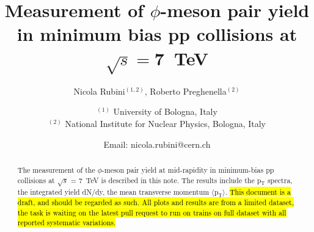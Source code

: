 \documentclass[ALICE,manyauthors]{ALICE_analysis_notes}
\begin{document}
%
%
%
\begin{titlepage}
%
\PHdate{\today}
%
\title{Measurement of $\phi$-meson pair yield in minimum bias pp collisions at $\sqrt{s}=$\SI{7}{\tera\electronvolt}}
%
\author{Nicola Rubini$^{(1,2)}$, Roberto Preghenella$^{(2)}$}
\author{
$^{(1)}$ University of Bologna, Italy\\
$^{(2)}$ National Institute for Nuclear Physics, Bologna, Italy\\
}
\author{Email: nicola.rubini@cern.ch}
%
%
\begin{abstract}
The measurement of the $\phi$-meson pair yield at mid-rapidity in minimum-bias pp collisions at $\sqrt{s}$ = \SI{7}{\tera\electronvolt} is described in this note. The results include the p$_{\text{T}}$ spectra, the integrated yield dN/dy, the mean transverse momentum $\langle \text{p}_{\text{T}} \rangle$. \hl{This document is a draft, and should be regarded as such. All plots and results are from a limited dataset, the task is waiting on the latest pull request to run on trains on full dataset with all reported systematic variations.}
\end{abstract}
\end{titlepage}
%
\tableofcontents
\newpage
%
%
\setcounter{secnumdepth}{0}

\setcounter{secnumdepth}{1}
\newpage

\newpage

\newpage

\newpage

\newpage

\newpage

\newpage

\newpage

\newpage
\appendix
%
\newpage
%
\printbibliography
%
\end{document}
